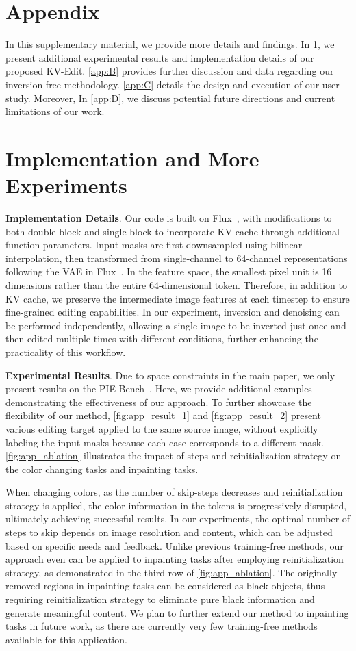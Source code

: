 \section*{Appendix}
In this supplementary material, we provide more details and findings. In \cref{app:A}, we present additional experimental results and implementation details of our proposed KV-Edit. \cref{app:B} provides further discussion and data regarding our inversion-free methodology. \cref{app:C} details the design and execution of our user study. Moreover, In \cref{app:D}, we discuss potential future directions and current limitations of our work.
\section{Implementation and More Experiments}
\label{app:A}

\noindent\textbf{Implementation Details}.
Our code is built on Flux~\cite{flux}, with modifications to both double block and single block to incorporate KV cache through additional function parameters. Input masks are first downsampled using bilinear interpolation, then transformed from single-channel to 64-channel representations following the VAE in Flux~\cite{flux}. In the feature space, the smallest pixel unit is 16 dimensions rather than the entire 64-dimensional token. Therefore, in addition to KV cache, we preserve the intermediate image features at each timestep to ensure fine-grained editing capabilities. In our experiment, inversion and denoising can be performed independently, allowing a single image to be inverted just once and then edited multiple times with different conditions, further enhancing the practicality of this workflow.

\noindent\textbf{Experimental Results}.
Due to space constraints in the main paper, we only present results on the PIE-Bench~\cite{ju2024pnp}. Here, we provide additional examples demonstrating the effectiveness of our approach. To further showcase the flexibility of our method, \cref{fig:app_result_1} and \cref{fig:app_result_2} present various editing target applied to the same source image, without explicitly labeling the input masks because each case corresponds to a different mask. \cref{fig:app_ablation} illustrates the impact of steps and reinitialization strategy on the color changing tasks and inpainting tasks.

When changing colors, as the number of skip-steps decreases and reinitialization strategy is applied, the color information in the tokens is progressively disrupted, ultimately achieving successful results. In our experiments, the optimal number of steps to skip depends on image resolution and content, which can be adjusted based on specific needs and feedback. Unlike previous training-free methods, our approach even can be applied to inpainting tasks after employing reinitialization strategy, as demonstrated in the third row of \cref{fig:app_ablation}. The originally removed regions in inpainting tasks can be considered as black objects, thus requiring reinitialization strategy to eliminate pure black information and generate meaningful content. We plan to further extend our method to inpainting tasks in future work, as there are currently very few training-free methods available for this application.

